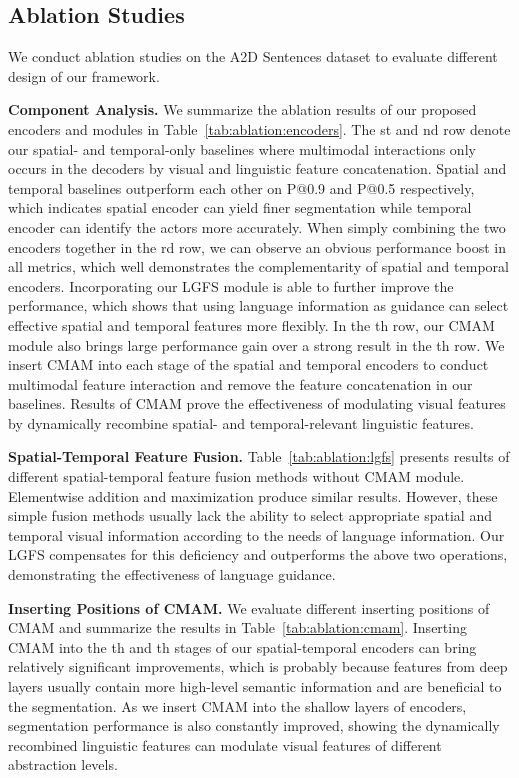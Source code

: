 \documentclass[final]{cvpr}
\begin{document}
\subsection{Ablation Studies}
We conduct ablation studies on the A2D Sentences dataset to evaluate different design of our framework. 

\textbf{Component Analysis.}
We summarize the ablation results of our proposed encoders and modules in Table~\ref{tab:ablation:encoders}.
The st and nd row denote our spatial- and temporal-only baselines where multimodal interactions only occurs in the decoders by visual and linguistic feature concatenation. 
Spatial and temporal baselines outperform each other on P@0.9 and P@0.5 respectively, which indicates spatial encoder can yield finer segmentation while temporal encoder can identify the actors more accurately. 
When simply combining the two encoders together in the rd row, we can observe an obvious performance boost in all metrics, which well demonstrates the complementarity of spatial and temporal encoders. 
Incorporating our LGFS module is able to further improve the performance, which shows that using language information as guidance can select effective spatial and temporal features more flexibly. 
In the th row, our CMAM module also brings large performance gain over a strong result in the th row. 
We insert CMAM into each stage of the spatial and temporal encoders to conduct multimodal feature interaction and remove the feature concatenation in our baselines. 
Results of CMAM prove the effectiveness of modulating visual features by dynamically recombine spatial- and temporal-relevant linguistic features.

\textbf{Spatial-Temporal Feature Fusion.}
Table~\ref{tab:ablation:lgfs} presents results of different spatial-temporal feature fusion methods without CMAM module. 
Elementwise addition and maximization produce similar results. 
However, these simple fusion methods usually lack the ability to select appropriate spatial and temporal visual information according to the needs of language information. 
Our LGFS compensates for this deficiency and outperforms the above two operations, demonstrating the effectiveness of language guidance.

\textbf{Inserting Positions of CMAM.}
We evaluate different inserting positions of CMAM and summarize the results in Table~\ref{tab:ablation:cmam}. 
Inserting CMAM into the th and th stages of our spatial-temporal encoders can bring relatively significant improvements, which is probably because features from deep layers usually contain more high-level semantic information and are beneficial to the segmentation. 
As we insert CMAM into the shallow layers of encoders, segmentation performance is also constantly improved, showing the dynamically recombined linguistic features can modulate visual features of different abstraction levels. 
\end{document}
